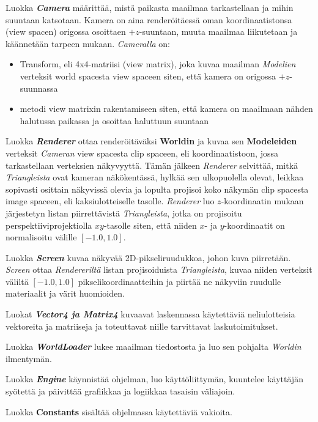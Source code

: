 \documentclass[12pt] {article}
\begin{document}
Luokka \textit{\textbf{Camera}} määrittää, mistä paikasta maailmaa tarkastellaan ja mihin suuntaan katsotaan. Kamera on aina renderöitäessä oman koordinaatistonsa (view spacen) origossa osoittaen $+z$-suuntaan, muuta maailmaa liikutetaan ja käännetään tarpeen mukaan. \textit{Cameralla} on:
\begin{itemize}
	\item Transform, eli 4x4-matriisi (view matrix), joka kuvaa maailman \textit{Modelien} verteksit world spacesta view spaceen siten, että kamera on origossa $+z$-suunnassa
	\item metodi view matrixin rakentamiseen siten, että kamera on maailmaan nähden halutussa paikassa ja osoittaa haluttuun suuntaan
\end{itemize}

Luokka \textit{\textbf{Renderer}} ottaa renderöitäväksi \textbf{Worldin} ja kuvaa sen \textbf{Modeleiden} verteksit \textit{Cameran} view spacesta clip spaceen, eli koordinaatistoon, jossa tarkastellaan verteksien näkyvyyttä. Tämän jälkeen \textit{Renderer} selvittää, mitkä \textit{Triangleista} ovat kameran näkökentässä, hylkää sen ulkopuolella olevat, leikkaa sopivasti osittain näkyvissä olevia ja lopulta projisoi koko näkymän clip spacesta image spaceen, eli kaksiulotteiselle tasolle. \textit{Renderer} luo $z$-koordinaatin mukaan järjestetyn listan piirrettävistä \textit{Triangleista}, jotka on projisoitu perspektiiviprojektiolla $xy$-tasolle siten, että niiden $x$- ja $y$-koordinaatit on normalisoitu välille $[-1.0, 1.0]$.

Luokka \textit{\textbf{Screen}} kuvaa näkyvää 2D-pikseliruudukkoa, johon kuva piirretään. \textit{Screen} ottaa \textit{Rendereriltä} listan projisoiduista \textit{Triangleista}, kuvaa niiden verteksit väliltä $[-1.0, 1.0]$ pikselikoordinaatteihin ja piirtää ne näkyviin ruudulle materiaalit ja värit huomioiden.

Luokat \textit{\textbf{Vector4 ja Matrix4}} kuvaavat laskennassa käytettäviä neliulotteisia vektoreita ja matriiseja ja toteuttavat niille tarvittavat laskutoimitukset.

Luokka \textit{\textbf{WorldLoader}} lukee maailman tiedostosta ja luo sen pohjalta \textit{Worldin} ilmentymän.

Luokka \textit{\textbf{Engine}} käynnistää ohjelman, luo käyttöliittymän, kuuntelee käyttäjän syötettä ja päivittää grafiikkaa ja logiikkaa tasaisin väliajoin.

Luokka \textbf{Constants} sisältää ohjelmassa käytettäviä vakioita.
\end{document}
